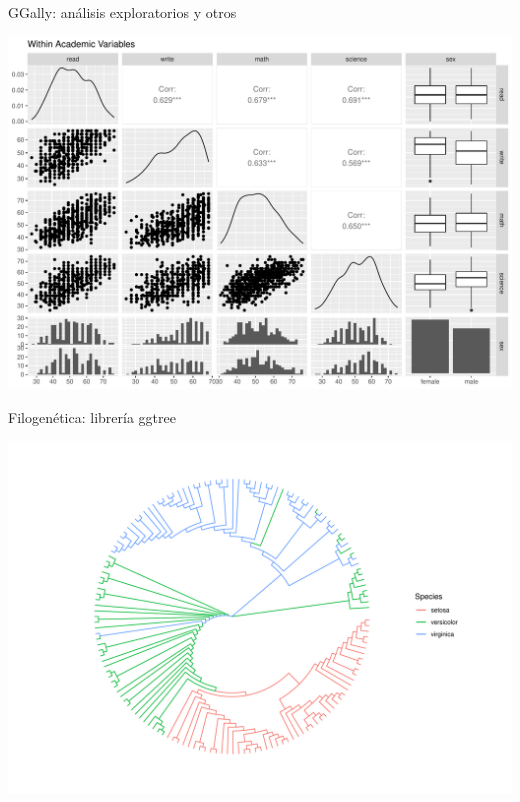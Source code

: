 \documentclass[
  10pt,
  ignorenonframetext,
]{beamer}
\begin{document}
\begin{frame}{GGally: análisis exploratorios y otros}
\protect\hypertarget{ggally-anuxe1lisis-exploratorios-y-otros}{}
\small

\includegraphics{claseIntro_practico12_final_files/figure-beamer/unnamed-chunk-19-1.pdf}

\normalsize
\end{frame}

\begin{frame}{Filogenética: librería ggtree}
\protect\hypertarget{filogenuxe9tica-libreruxeda-ggtree}{}
\small

\includegraphics{claseIntro_practico12_final_files/figure-beamer/unnamed-chunk-20-1.pdf}

\normalsize
\end{frame}
\end{document}

